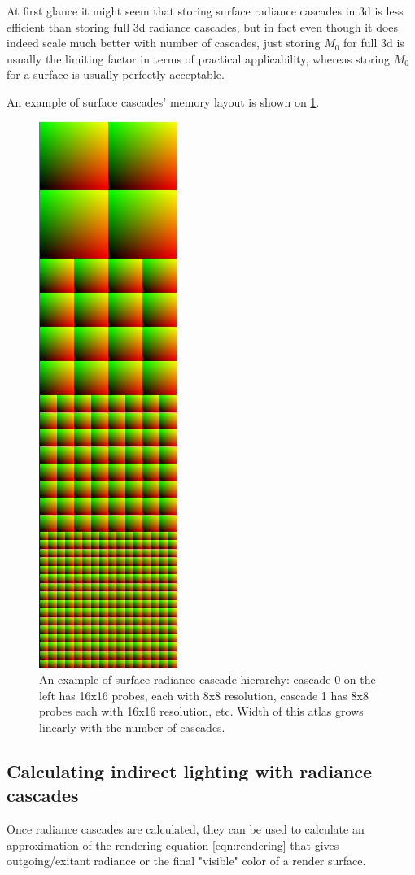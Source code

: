 \documentclass{jcgt}
\begin{document}
At first glance it might seem that storing surface radiance cascades in 3d is less efficient than storing full 3d radiance cascades, but in fact even though it does indeed scale much better with number of cascades, just storing $M_0$ for full 3d is usually the limiting factor in terms of practical applicability, whereas storing $M_0$ for a surface is usually perfectly acceptable.

An example of surface cascades' memory layout is shown on \ref{fig:surface_cascades}.
\begin{figure}[htb]
  \centering
  \includegraphics[height=\columnwidth, angle=-90]{images/surface_cascades.png}
  \caption{\label{fig:surface_cascades}
     An example of surface radiance cascade hierarchy: cascade 0 on the left has 16x16 probes, each with 8x8 resolution, cascade 1 has 8x8 probes each with 16x16 resolution, etc. Width of this atlas grows linearly with the number of cascades.}
\end{figure}

\subsection{Calculating indirect lighting with radiance cascades}
Once radiance cascades are calculated, they can be used to calculate an approximation of the rendering equation \cref{eqn:rendering} that gives outgoing/exitant radiance or the final "visible" color of a render surface.
\end{document}
